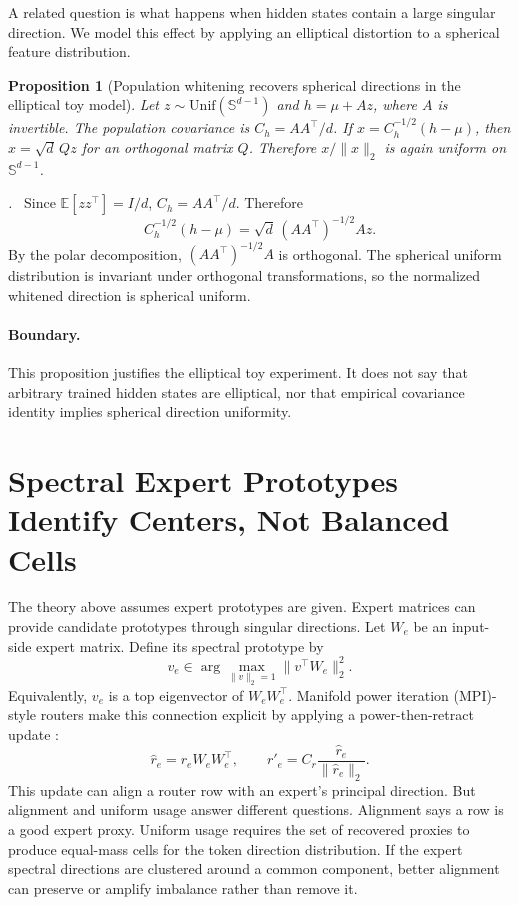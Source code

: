 \documentclass{article}
\newtheorem{proposition}{Proposition}
\renewenvironment{proof}[1][\proofname]{\par\noindent\textit{#1.}\ }{\hfill\qedsymbol\par}
\begin{document}
A related question is what happens when hidden states contain a large singular
direction.  We model this effect by applying an elliptical distortion to a
spherical feature distribution.

\begin{proposition}[Population whitening recovers spherical directions in the
elliptical toy model]
\label{prop:whitening}
Let $z\sim\mathrm{Unif}(\mathbb{S}^{d-1})$ and $h=\mu+Az$, where $A$ is
invertible.  The population covariance is $C_h=AA^\top/d$.  If
$x=C_h^{-1/2}(h-\mu)$, then $x=\sqrt d\,Qz$ for an orthogonal matrix $Q$.
Therefore $x/\|x\|_2$ is again uniform on $\mathbb{S}^{d-1}$.
\end{proposition}

\begin{proof}
Since $\mathbb{E}[zz^\top]=I/d$, $C_h=AA^\top/d$.  Therefore
\begin{equation}
 C_h^{-1/2}(h-\mu)
 =\sqrt d\,(AA^\top)^{-1/2}Az.
\end{equation}
By the polar decomposition, $(AA^\top)^{-1/2}A$ is orthogonal.  The spherical
uniform distribution is invariant under orthogonal transformations, so the
normalized whitened direction is spherical uniform.
\end{proof}

\paragraph{Boundary.}
This proposition justifies the elliptical toy experiment.  It does not say that
arbitrary trained hidden states are elliptical, nor that empirical covariance
identity implies spherical direction uniformity.

\section{Spectral Expert Prototypes Identify Centers, Not Balanced Cells}

The theory above assumes expert prototypes are given.  Expert matrices can
provide candidate prototypes through singular directions.  Let $W_e$ be an
input-side expert matrix.  Define its spectral prototype by
\begin{equation}
 v_e\in\arg\max_{\|v\|_2=1}\|v^\top W_e\|_2^2.
\end{equation}
Equivalently, $v_e$ is a top eigenvector of $W_eW_e^\top$.  Manifold power
iteration (MPI)-style routers make this connection explicit by applying a
power-then-retract update
\citep{routermpi2026}:
\begin{equation}
 \widehat r_e=r_eW_eW_e^\top,
 \qquad
 r'_e=C_r\frac{\widehat r_e}{\|\widehat r_e\|_2}.
\end{equation}
This update can align a router row with an expert's principal direction.  But
alignment and uniform usage answer different questions.  Alignment says a row is
a good expert proxy.  Uniform usage requires the set of recovered proxies to
produce equal-mass cells for the token direction distribution.  If the expert
spectral directions are clustered around a common component, better alignment
can preserve or amplify imbalance rather than remove it.
\end{document}
